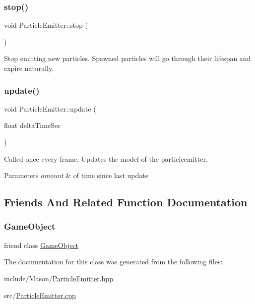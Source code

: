 \subsubsection{\texorpdfstring{stop()}{stop()}}
{\footnotesize\ttfamily void Particle\+Emitter\+::stop (\begin{DoxyParamCaption}{ }\end{DoxyParamCaption})}



Stop emitting new particles. Spawned particles will go through their lifespan and expire naturally. 

\hypertarget{class_mason_1_1_particle_emitter_a34da56b84fe4810c701f4b1541e079dc}{}\label{class_mason_1_1_particle_emitter_a34da56b84fe4810c701f4b1541e079dc} 
\subsubsection{\texorpdfstring{update()}{update()}}
{\footnotesize\ttfamily void Particle\+Emitter\+::update (\begin{DoxyParamCaption}\item[{float}]{delta\+Time\+Sec }\end{DoxyParamCaption})}



Called once every frame. Updates the model of the particleemitter. 


\begin{DoxyParams}{Parameters}
{\em amount} & of time since last update \\
\hline
\end{DoxyParams}


\subsection{Friends And Related Function Documentation}
\hypertarget{class_mason_1_1_particle_emitter_a00df87c957d8f7ee0fc51f07a0542f4a}{}\label{class_mason_1_1_particle_emitter_a00df87c957d8f7ee0fc51f07a0542f4a} 
\subsubsection{\texorpdfstring{Game\+Object}{GameObject}}
{\footnotesize\ttfamily friend class \hyperlink{class_mason_1_1_game_object}{Game\+Object}\hspace{0.3cm}{\ttfamily [friend]}}



The documentation for this class was generated from the following files\+:\begin{DoxyCompactItemize}
\item 
include/\+Mason/\hyperlink{_particle_emitter_8hpp}{Particle\+Emitter.\+hpp}\item 
src/\hyperlink{_particle_emitter_8cpp}{Particle\+Emitter.\+cpp}\end{DoxyCompactItemize}

